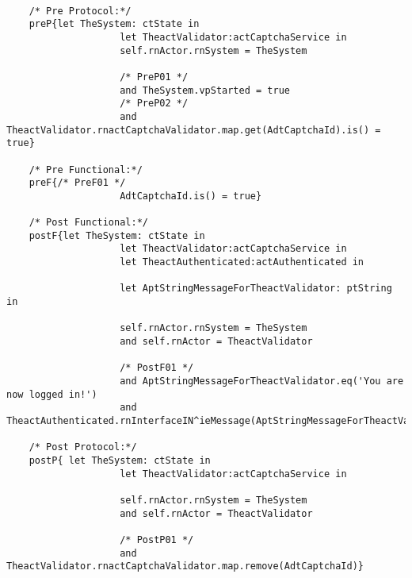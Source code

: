 	\scriptsize
	\vspace{0.5cm}
	\begin{lstlisting}[style=MessirStyle,firstnumber=auto,captionpos=b,caption={\msrmessir (MCL-oriented) specification of the operation \emph{oeCaptchaValid}.},label=OM-actCaptchaService-oeCaptchaValid-MCL-LST]

	/* Pre Protocol:*/ 
	preP{let TheSystem: ctState in
	  				let TheactValidator:actCaptchaService in
					self.rnActor.rnSystem = TheSystem
	  
					/* PreP01 */
					and TheSystem.vpStarted = true
					/* PreP02 */
					and TheactValidator.rnactCaptchaValidator.map.get(AdtCaptchaId).is() = true}
	
	/* Pre Functional:*/
	preF{/* PreF01 */
					AdtCaptchaId.is() = true}
	
	/* Post Functional:*/ 
	postF{let TheSystem: ctState in
					let TheactValidator:actCaptchaService in
					let TheactAuthenticated:actAuthenticated in
					
					let AptStringMessageForTheactValidator: ptString in
					  
					self.rnActor.rnSystem = TheSystem
					and self.rnActor = TheactValidator
					
					/* PostF01 */
					and AptStringMessageForTheactValidator.eq('You are now logged in!')
					and TheactAuthenticated.rnInterfaceIN^ieMessage(AptStringMessageForTheactValidator)}
	
	/* Post Protocol:*/ 
	postP{ let TheSystem: ctState in
				  	let TheactValidator:actCaptchaService in
				  
				  	self.rnActor.rnSystem = TheSystem
				  	and self.rnActor = TheactValidator
				  	
				  	/* PostP01 */
					and TheactValidator.rnactCaptchaValidator.map.remove(AdtCaptchaId)}
	
	\end{lstlisting}
	\normalsize 
	
	
	
	





